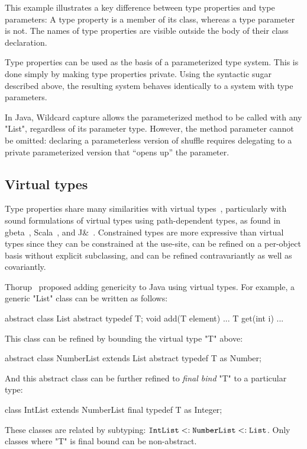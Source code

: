 \documentclass{llncs}
\begin{document}
This example illustrates a key difference between type properties
and type parameters:
A type property is a member of its class, whereas a type parameter is
not.  The names of type properties are visible outside the body of
their class declaration.

Type properties can be used as the basis of a parameterized type
system.  This is done simply by making type properties private.
Using the syntactic sugar described above,
the resulting system behaves identically to a system with type
parameters.
\fi

In Java,
Wildcard
capture allows the parameterized method to be called with any \xcd"List",
regardless of its parameter type.
However,
the method parameter cannot be omitted: declaring a parameterless version
of shuffle requires delegating to a private parameterized version that 
``opens up'' the parameter.

\subsection{Virtual types}

Type properties share many similarities with virtual types~\cite{mp89-virtual-classes,beta}, particularly 
with sound formulations of virtual types using path-dependent types,
as found in gbeta~\cite{ernst99-gbeta}, Scala~\cite{scala}, 
and J\&~\cite{nqm06}.
%
Constrained types are more expressive than virtual
types since they can be constrained at the use-site,
can be refined on a per-object basis without explicit subclassing,
and can be refined contravariantly
as well as covariantly.

Thorup~\cite{thorup97}
proposed adding genericity to Java using virtual types.  For example,
a generic \xcd"List" class can be written as follows:
\begin{xten}
abstract class List {
    abstract typedef T;
    void add(T element) { ... }
    T get(int i) { ... }
}
\end{xten}
This class can be refined by bounding the virtual type \xcd"T" above:
\begin{xten}
abstract class NumberList extends List {
    abstract typedef T as Number;
}
\end{xten}
And this abstract class can be further refined to \emph{final bind}
\xcd"T" to a particular type:
\begin{xten}
class IntList extends NumberList {
    final typedef T as Integer;
}
\end{xten}
These classes are related by subtyping:
${\tt IntList} \subtype {\tt NumberList} \subtype {\tt List}$.
Only classes where \xcd"T" is final bound can be non-abstract.
\end{document}
